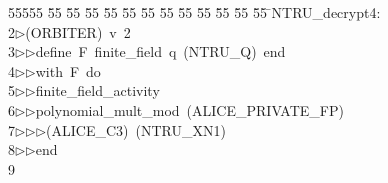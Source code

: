 %
%
\begin{tabbing}
55555 \= 55 \= 55 \= 55 \= 55 \= 55 \= 55 \= 55 \= 55 \= 55 \= 55 \= 55 \= 55 \= \>NTRU\_decrypt4:\\[0pt]
2\>$\triangleright$\>(ORBITER)\ v\ 2\ \\[0pt]
3\>$\triangleright$\>$\triangleright$\>define\ F\ finite\_field\ q\ (NTRU\_Q)\ end\ \\[0pt]
4\>$\triangleright$\>$\triangleright$\>with\ F\ do\ \\[0pt]
5\>$\triangleright$\>$\triangleright$\>finite\_field\_activity\ \\[0pt]
6\>$\triangleright$\>$\triangleright$\>polynomial\_mult\_mod\ (ALICE\_PRIVATE\_FP)\ \\[0pt]
7\>$\triangleright$\>$\triangleright$\>$\triangleright$\>(ALICE\_C3)\ (NTRU\_XN1)\ \\[0pt]
8\>$\triangleright$\>$\triangleright$\>end\\[0pt]
9\>\end{tabbing}
